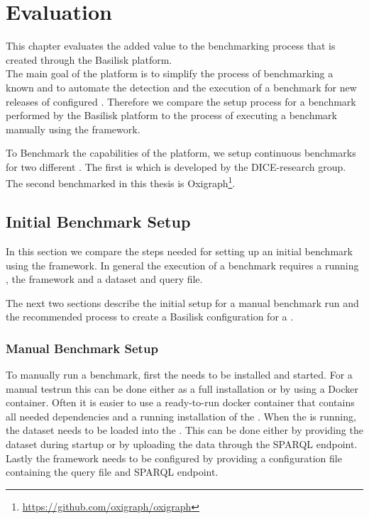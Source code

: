 \chapter{Evaluation}
\label{ch:evaluation}

This chapter evaluates the added value to the benchmarking process that is created through the Basilisk platform.
\\

The main goal of the platform is to simplify the process of benchmarking a known \tsp{} and to automate the detection and the execution of a benchmark for new releases of configured \tsp{}.
Therefore we compare the setup process for a benchmark performed by the Basilisk platform to the process of executing a benchmark manually using the \iguana{} framework.

To Benchmark the capabilities of the platform, we setup continuous benchmarks for two different \tsp{}.
The first \ts{} is \tentris{}\cite{bigerlTentrisTensorBasedTriple2020} which is developed by the DICE-research group.
The second \ts{} benchmarked in this thesis is Oxigraph\footnote{\url{https://github.com/oxigraph/oxigraph}}.

\section{Initial Benchmark Setup}
In this section we compare the steps needed for setting up an initial \ts{} benchmark using the \iguana{} framework.
In general the execution of a benchmark requires a running \ts{}, the \iguana{} framework and a dataset and query file.

The next two sections describe the initial setup for a manual benchmark run and the recommended process to create a Basilisk configuration for a \ts{}.


\subsection{Manual Benchmark Setup}
\label{sec:eval_manual_benchmark_setup}
To manually run a benchmark, first the \ts{} needs to be installed and started.
For a manual testrun this can be done either as a full installation or by using a Docker container.
Often it is easier to use a ready-to-run docker container that contains all needed dependencies and a running installation of the \ts{}.
When the \ts{} is running, the dataset needs to be loaded into the \ts{}.
This can be done either by providing the dataset during startup or by uploading the data through the SPARQL endpoint.
Lastly the \iguana{} framework needs to be configured by providing a configuration file containing the query file and SPARQL endpoint.



